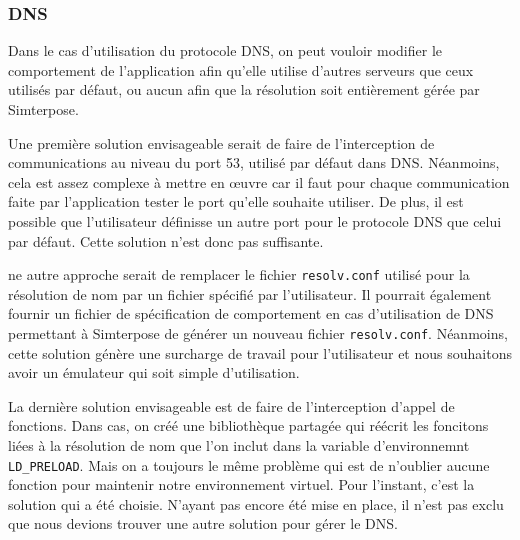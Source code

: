 \subsubsection{DNS}

Dans le cas d'utilisation du protocole DNS, on peut vouloir modifier le
comportement de l'application afin qu'elle utilise d'autres serveurs que ceux
utilisés par défaut, ou aucun afin que la résolution soit entièrement gérée par
Simterpose. 

Une première solution envisageable serait de faire de l'interception de
communications au niveau du port 53, utilisé par défaut dans DNS. Néanmoins,
cela est assez complexe à mettre en \oe uvre car il faut pour chaque
communication faite par l'application tester le port qu'elle souhaite
utiliser. De plus, il est possible que l'utilisateur définisse un autre port
pour le protocole DNS que celui par défaut. Cette solution n'est donc pas
suffisante.

ne autre approche serait de remplacer le fichier \texttt{resolv.conf}
utilisé pour la résolution de nom par un fichier spécifié par
l'utilisateur. Il pourrait également fournir un fichier de
spécification de comportement en cas d'utilisation de DNS permettant
à Simterpose de générer un nouveau
fichier \texttt{resolv.conf}. Néanmoins, cette solution génère une
surcharge de travail pour l'utilisateur et nous souhaitons avoir un
émulateur qui soit simple d'utilisation.

La dernière solution envisageable est de faire de l'interception d'appel de
fonctions. Dans cas, on créé une bibliothèque partagée qui réécrit les foncitons
liées à la résolution de nom que l'on inclut dans la variable d'environnemnt
\texttt{LD\_PRELOAD}. Mais on a toujours le même problème qui est de n'oublier
aucune fonction pour maintenir notre environnement virtuel. Pour l'instant,
c'est la solution qui a été choisie. N'ayant pas encore été mise en place, il
n'est pas exclu que nous devions trouver une autre solution pour gérer le DNS.

\vspace{0.5cm}
